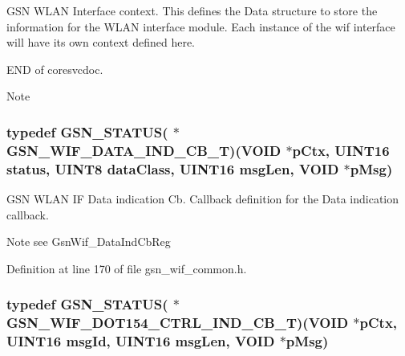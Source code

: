 GSN WLAN Interface context. This defines the Data structure to store the information for the WLAN interface module. Each instance of the wif interface will have its own context defined here. 

END of coresvcdoc.

\begin{DoxyNote}{Note}

\end{DoxyNote}
\hypertarget{a00635_gad46de129691b078bd6ff8df7f46318d2}{
\subsubsection[{GSN\_\-WIF\_\-DATA\_\-IND\_\-CB\_\-T}]{\setlength{\rightskip}{0pt plus 5cm}typedef {\bf GSN\_\-STATUS}( $\ast$ {\bf GSN\_\-WIF\_\-DATA\_\-IND\_\-CB\_\-T})(VOID $\ast$pCtx, {\bf UINT16} status, {\bf UINT8} dataClass, {\bf UINT16} msgLen, VOID $\ast$pMsg)}}
\label{a00635_gad46de129691b078bd6ff8df7f46318d2}


GSN WLAN IF Data indication Cb. Callback definition for the Data indication callback. 

\begin{DoxyNote}{Note}
see GsnWif\_\-DataIndCbReg 
\end{DoxyNote}


Definition at line 170 of file gsn\_\-wif\_\-common.h.

\hypertarget{a00635_gaf83e1299bf211f7c06ff40e18f1d3ad4}{
\subsubsection[{GSN\_\-WIF\_\-DOT154\_\-CTRL\_\-IND\_\-CB\_\-T}]{\setlength{\rightskip}{0pt plus 5cm}typedef {\bf GSN\_\-STATUS}( $\ast$ {\bf GSN\_\-WIF\_\-DOT154\_\-CTRL\_\-IND\_\-CB\_\-T})(VOID $\ast$pCtx, {\bf UINT16} msgId, {\bf UINT16} msgLen, VOID $\ast$pMsg)}}
\label{a00635_gaf83e1299bf211f7c06ff40e18f1d3ad4}


